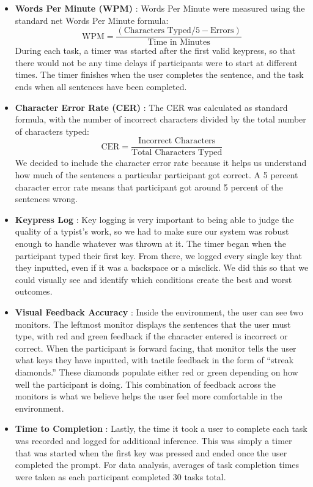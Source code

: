 \documentclass[acmlarge]{acmart}
\begin{document}
\begin{itemize}
    \item \textbf{Words Per Minute (WPM)} : Words Per Minute were measured using the standard net Words Per Minute formula:  
    \[
    \text{WPM} = \frac{(\text{Characters Typed} / 5 - \text{Errors})}{\text{Time in Minutes}}
    \]
    During each task, a timer was started after the first valid keypress, so that there would not be any time delays if participants were to start at different times. The timer finishes when the user completes the sentence, and the task ends when all sentences have been completed.
    
    \item \textbf{Character Error Rate (CER)} : The CER was calculated as standard formula, with the number of incorrect characters divided by the total number of characters typed:
        \[
        \text{CER} = \frac{\text{Incorrect Characters}}{\text{Total Characters Typed}}
        \]
        We decided to include the character error rate because it helps us understand how much of the sentences a particular participant got correct. A 5 percent character error rate means that participant got around 5 percent of the sentences wrong. 


    \item \textbf{Keypress Log} : Key logging is very important to being able to judge the quality of a typist's work, so we had to make sure our system was robust enough to handle whatever was thrown at it. The timer began when the participant typed their first key. From there, we logged every single key that they inputted, even if it was a backspace or a misclick. We did this so that we could visually see and identify which conditions create the best and worst outcomes. 


    \item \textbf{Visual Feedback Accuracy} : Inside the environment, the user can see two monitors. The leftmost monitor displays the sentences that the user must type, with red and green feedback if the character entered is incorrect or correct. When the participant is forward facing, that monitor tells the user what keys they have inputted, with tactile feedback in the form of “streak diamonds.” These diamonds populate either red or green depending on how well the participant is doing. This combination of feedback across the monitors is what we believe helps the user feel more comfortable in the environment. 

    \item \textbf{Time to Completion} : Lastly, the time it took a user to complete each task was recorded and logged for additional inference. This was simply a timer that was started when the first key was pressed and ended once the user completed the prompt. For data analysis, averages of task completion times were taken as each participant completed 30 tasks total. 
\end{itemize}
\end{document}
